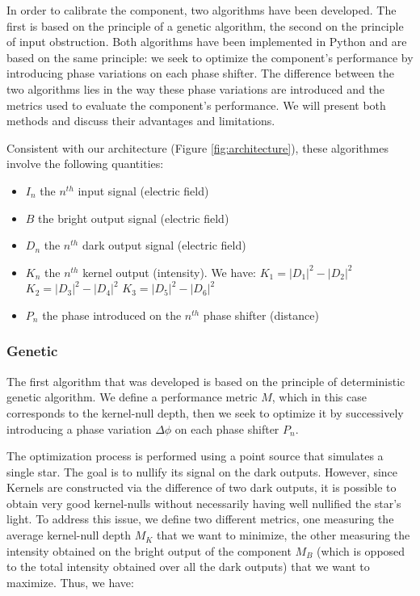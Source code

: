 \documentclass{aa}
\begin{document}
        In order to calibrate the component, two algorithms have been developed. The first is based on the principle of a genetic algorithm, the second on the principle of input obstruction. Both algorithms have been implemented in Python and are based on the same principle: we seek to optimize the component's performance by introducing phase variations on each phase shifter. The difference between the two algorithms lies in the way these phase variations are introduced and the metrics used to evaluate the component's performance. We will present both methods and discuss their advantages and limitations.

        Consistent with our architecture (Figure \ref{fig:architecture}), these algorithmes involve the following quantities:
        \begin{itemize}
            \item $I_n$ the $n^{th}$ input signal (electric field)
            \item $B$ the bright output signal (electric field)
            \item $D_n$ the $n^{th}$ dark output signal (electric field)
            \item $K_n$ the $n^{th}$ kernel output (intensity). We have:
            \subitem $K_1 = |D_1|^2 - |D_2|^2$
            \subitem $K_2 = |D_3|^2 - |D_4|^2$
            \subitem $K_3 = |D_5|^2 - |D_6|^2$
            \item $P_n$ the phase introduced on the $n^{th}$ phase shifter (distance)
        \end{itemize}

        \subsubsection{Genetic}
            The first algorithm that was developed is based on the principle of deterministic genetic algorithm. We define a performance metric $M$, which in this case corresponds to the kernel-null depth, then we seek to optimize it by successively introducing a phase variation $\Delta \phi$ on each phase shifter $P_n$.

            The optimization process is performed using a point source that simulates a single star. The goal is to nullify its signal on the dark outputs. However, since Kernels are constructed via the difference of two dark outputs, it is possible to obtain very good kernel-nulls without necessarily having well nullified the star's light. To address this issue, we define two different metrics, one measuring the average kernel-null depth $M_K$ that we want to minimize, the other measuring the intensity obtained on the bright output of the component $M_B$ (which is opposed to the total intensity obtained over all the dark outputs) that we want to maximize. Thus, we have:
\end{document}
